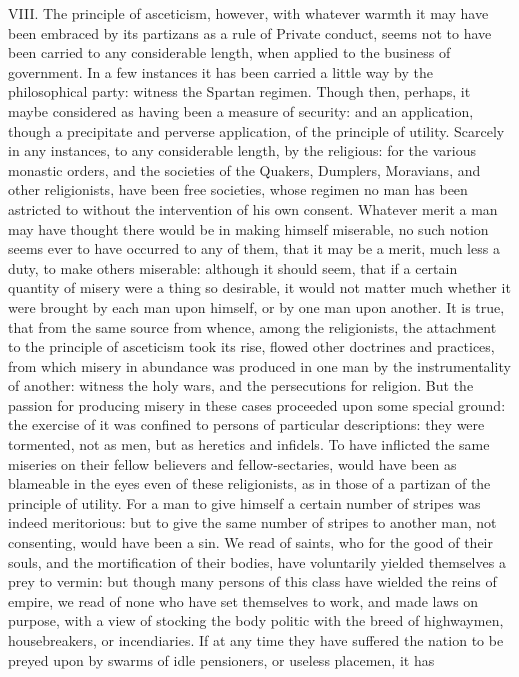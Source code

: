 \documentclass[12pt]{report}
\begin{document}
VIII. The principle of asceticism, however, with whatever warmth it may
have been embraced by its partizans as a rule of Private conduct, seems
not to have been carried to any considerable length, when applied to the
business of government. In a few instances it has been carried a little
way by the philosophical party: witness the Spartan regimen. Though
then, perhaps, it maybe considered as having been a measure of security:
and an application, though a precipitate and perverse application, of
the principle of utility. Scarcely in any instances, to any considerable
length, by the religious: for the various monastic orders, and the
societies of the Quakers, Dumplers, Moravians, and other religionists,
have been free societies, whose regimen no man has been astricted to
without the intervention of his own consent. Whatever merit a man may
have thought there would be in making himself miserable, no such notion
seems ever to have occurred to any of them, that it may be a merit, much
less a duty, to make others miserable: although it should seem, that if
a certain quantity of misery were a thing so desirable, it would not
matter much whether it were brought by each man upon himself, or by one
man upon another. It is true, that from the same source from whence,
among the religionists, the attachment to the principle of asceticism
took its rise, flowed other doctrines and practices, from which misery
in abundance was produced in one man by the instrumentality of another:
witness the holy wars, and the persecutions for religion. But the
passion for producing misery in these cases proceeded upon some special
ground: the exercise of it was confined to persons of particular
descriptions: they were tormented, not as men, but as heretics and
infidels. To have inflicted the same miseries on their fellow believers
and fellow-sectaries, would have been as blameable in the eyes even of
these religionists, as in those of a partizan of the principle of
utility. For a man to give himself a certain number of stripes was
indeed meritorious: but to give the same number of stripes to another
man, not consenting, would have been a sin. We read of saints, who for
the good of their souls, and the mortification of their bodies, have
voluntarily yielded themselves a prey to vermin: but though many persons
of this class have wielded the reins of empire, we read of none who have
set themselves to work, and made laws on purpose, with a view of
stocking the body politic with the breed of highwaymen, housebreakers,
or incendiaries. If at any time they have suffered the nation to be
preyed upon by swarms of idle pensioners, or useless placemen, it has
\end{document}
